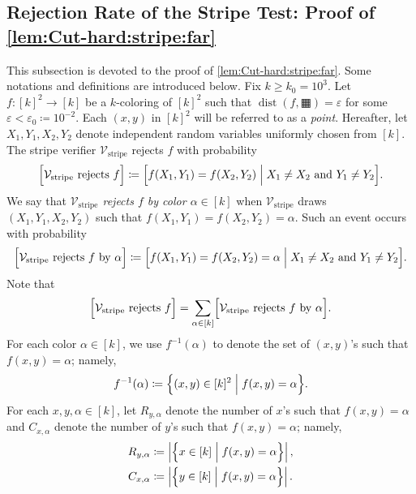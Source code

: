 \documentclass[11pt,fleqn]{article}
\renewcommand{\geq}{\geqslant}
\renewcommand{\epsilon}{\varepsilon}
\newcommand{\defeq}{\coloneq}
\DeclareMathOperator{\rHam}{\mathrm{dist}}
\newcommand{\V}{\calV}
\newcommand{\f}{f}
\newcommand{\kzero}{10^3}
\newcommand{\epsilonzero}{10^{-2}}
\newcommand{\str}{\squarehvfill}
\newcommand{\Vstripe}{\V_\mathrm{stripe}}
\newcommand{\calV}{\mathcal{V}}
\let\Pr\relax\DeclareMathOperator*{\Pr}{\mathbb{P}}
\theoremstyle{definition}
\numberwithin{equation}{section}
\begin{document}
\subsection{Rejection Rate of the Stripe Test: Proof of \texorpdfstring{\cref{lem:Cut-hard:stripe:far}}{Lemma~\protect\ref{lem:Cut-hard:stripe:far}}}
\label{sec:Cut-hard:stripe:far}


This subsection is devoted to the proof of \cref{lem:Cut-hard:stripe:far}.
Some notations and definitions are introduced below.
Fix $k \geq k_0 = \kzero$.
Let $\f \colon [k]^2 \to [k]$ be a $k$-coloring of $[k]^2$ such that
$\rHam(\f,\str) = \epsilon$
for some $\epsilon < \epsilon_0 \defeq \epsilonzero$.
Each $(x,y)$ in $[k]^2$ will be referred to as a \emph{point}.
Hereafter, let $X_1,Y_1,X_2,Y_2$ denote independent random variables uniformly chosen from $[k]$.
The stripe verifier $\Vstripe$ rejects $\f$ with probability
\begin{align}
    \Pr\Bigl[ \Vstripe \text{ rejects } \f \Bigr] \defeq
    \Pr\Bigl[
        \f(X_1,Y_1) = \f(X_2,Y_2) \Bigm| X_1 \neq X_2 \text{ and } Y_1 \neq Y_2
    \Bigr].
\end{align}
We say that \emph{$\Vstripe$ rejects $\f$ by color $\alpha \in [k]$} when
    $\Vstripe$ draws $(X_1,Y_1,X_2,Y_2)$ such that
    $\f(X_1,Y_1) = \f(X_2,Y_2) = \alpha$.
Such an event occurs with probability
\begin{align}
    \Pr\Bigl[ \Vstripe \text{ rejects } \f \text{ by } \alpha \Bigr]
    \defeq \Pr\Bigl[
        \f(X_1,Y_1) = \f(X_2,Y_2) = \alpha \Bigm| X_1 \neq X_2 \text{ and } Y_1 \neq Y_2
    \Bigr].
\end{align}
Note that
\begin{align}
    \Pr\Bigl[ \Vstripe \text{ rejects } \f \Bigr]
    = \sum_{\alpha \in [k]} \Pr\Bigl[ \Vstripe \text{ rejects } \f \text{ by } \alpha \Bigr].
\end{align}
For each color $\alpha \in [k]$, 
we use $\f^{-1}(\alpha)$ to denote the set of $(x,y)$'s such that $\f(x,y) = \alpha$; namely,
\begin{align}
    \f^{-1}(\alpha) \defeq \Bigl\{
        (x,y) \in [k]^2 \Bigm| \f(x,y) = \alpha
    \Bigr\}.
\end{align}
For each $x,y,\alpha \in [k]$, let
$R_{y,\alpha}$ denote the number of $x$'s such that $\f(x,y) = \alpha$ and
$C_{x,\alpha}$ denote the number of $y$'s such that $\f(x,y) = \alpha$; namely,
\begin{align}
\begin{aligned}
    R_{y,\alpha} & \defeq 
        \left|\Bigl\{ x \in [k] \Bigm| \f(x,y) = \alpha \Bigr\}\right|, \\
    C_{x,\alpha} & \defeq
        \left|\Bigl\{ y \in [k] \Bigm| \f(x,y) = \alpha \Bigr\}\right|.
\end{aligned}
\end{align}
\end{document}
